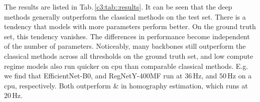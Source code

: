 


The results are listed in Tab.\,\ref{c3:tab::results}. It can be seen that the deep methods generally outperform the classical methods on the test set. There is a tendency that models with more parameters perform better. On the ground truth set, this tendency vanishes. The differences in performance become independent of the number of parameters. Noticeably, many backbones still outperform the classical methods across all thresholds on the ground truth set, and low compute regime models also run quicker on \gls{cpu} than comparable classical methods. E.g. we find that EfficientNet-B0, and RegNetY-400MF run at $36\,\text{Hz}$, and $50\,\text{Hz}$ on a \gls{cpu}, respectively. Both outperform  \&  in homography estimation, which runs at $20\,\text{Hz}$.


